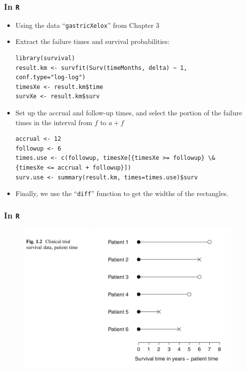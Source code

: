 \documentclass{beamer}
\begin{document}
\pagebreak
\begin{frame}[fragile]
\frametitle{In \texttt{R}}
\begin{itemize}
\item Using the data ``\texttt{gastricXelox}'' from Chapter 3
\item Extract the failure times and survival probabilities:
\begin{Verbatim}
library(survival)
result.km <- survfit(Surv(timeMonths, delta) ~ 1,
conf.type="log-log") 
timesXe <- result.km$time 
survXe <- result.km$surv
\end{Verbatim}
\item Set up the accrual and follow-up times, and select the portion of the failure times in the interval from $f$ to $a+f$ 
\begin{Verbatim}
accrual <- 12
followup <- 6
times.use <- c(followup, timesXe[{timesXe >= followup} \&
{timesXe <= accrual + followup}])
surv.use <- summary(result.km, times=times.use)$surv
\end{Verbatim}
\item Finally, we use the ``\texttt{diff}'' function to get the widths of the rectangles.
\end{itemize}
\end{frame}

\pagebreak
\begin{frame}
\frametitle{In \texttt{R}}
\begin{figure}[h!]
\includegraphics[scale = .5]{002.png}
\end{figure}
\end{frame}
\end{document}
